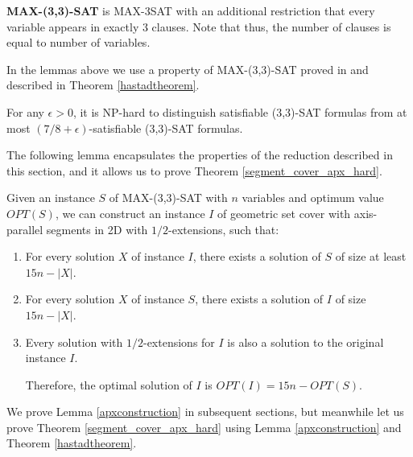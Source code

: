 \begin{defi}
\textbf{MAX-(3,3)-SAT} is  MAX-3SAT with an additional
restriction that every variable appears in exactly 3 clauses.
Note that thus, the number of clauses is equal to number of variables.
\end{defi}

In the lemmas above we use
a property of MAX-(3,3)-SAT proved in \cite{hastad} and described in
Theorem \ref{hastadtheorem}.

\begin{tw}{
	\label{hastadtheorem}
	\textbf{\cite{hastad}}
	
	For any $\epsilon > 0$, it is NP-hard to distinguish satisfiable
	(3,3)-SAT formulas from
	at most
	\linebreak\mbox{$(7/8 + \epsilon)$-satisfiable}
	(3,3)-SAT formulas.
}\end{tw}

The following lemma encapsulates the properties
of the reduction described in this section,
and it allows us to prove Theorem \ref{segment_cover_apx_hard}.

\begin{lemma}{
	\label{apxconstruction}
	Given an instance $S$ of  MAX-(3,3)-SAT 
	with $n$ variables and optimum value $OPT(S)$,
	we can construct an instance $I$ of geometric set cover with
	axis-parallel segments in 2D
	with $1/2$-extensions, such that:
	\begin{enumerate}[label={(\arabic*)}]
	\item For every solution $X$ of instance $I$,
	there exists a solution of $S$ of size at least  $15n - |X|$.
	
	\item For every solution $X$ of instance $S$,
	there exists a solution of $I$ of size $15n - |X|$.
	
	\item Every solution with $1/2$-extensions for $I$
	is also a solution to the original instance $I$.
		
	Therefore, the optimal solution of $I$ is $OPT(I) = 15n - OPT(S)$. 
	\end{enumerate}
	
}\end{lemma}

We prove Lemma \ref{apxconstruction} in
subsequent sections, but meanwhile let us prove
Theorem \ref{segment_cover_apx_hard} using Lemma \ref{apxconstruction}
and Theorem \ref{hastadtheorem}.

